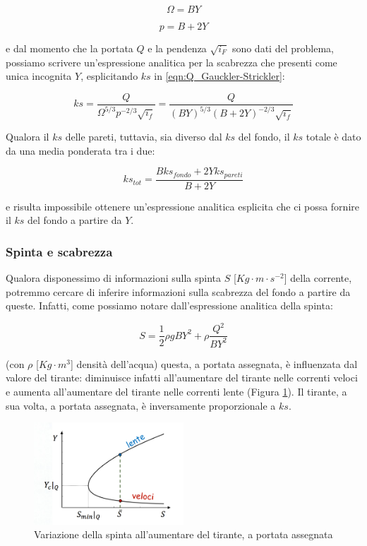 \documentclass[12pt]{article} %
\begin{document}
\begin{equation}
    \Omega=BY
\end{equation}

\begin{equation}
    p=B+2Y
\end{equation}

\noindent e dal momento che la portata $Q$ e la pendenza $\sqrt{i_F}$ sono dati del problema, possiamo scrivere un'espressione analitica per la scabrezza che presenti come unica incognita $Y$, esplicitando $ks$ in \ref{eqn:Q_Gauckler-Strickler}:

\begin{equation}
    ks=\frac{Q}{\Omega^{5/3}p^{-2/3}\sqrt{i_f}}=\frac{Q}{(BY)^{5/3}(B+2Y)^{-2/3}\sqrt{i_f}}
\end{equation}

\noindent Qualora il $ks$ delle pareti, tuttavia, sia diverso dal $ks$ del fondo, il $ks$ totale è dato da una media ponderata tra i due:

\begin{equation}
    ks_{tot} = \frac{Bks_{fondo} + 2Yks_{pareti}}{B+2Y}
\end{equation}

\noindent e risulta impossibile ottenere un'espressione analitica esplicita che ci possa fornire il $ks$ del fondo a partire da $Y$.

\subsubsection{Spinta e scabrezza}
\noindent Qualora disponessimo di informazioni sulla spinta $S$ [$Kg\cdot m\cdot s^{-2}$] della corrente, potremmo cercare di inferire informazioni sulla scabrezza del fondo a partire da queste. Infatti, come possiamo notare dall'espressione analitica della spinta:

\begin{equation}
    S=\frac{1}{2}\rho gBY^2+\rho\frac{Q^2}{BY^2}
    \label{eqn:S}
\end{equation}

\noindent (\noindent con $\rho$ [$Kg\cdot m^3$] densità dell'acqua) questa, a portata assegnata, è influenzata dal valore del tirante: diminuisce infatti all'aumentare del tirante nelle correnti veloci e aumenta all'aumentare del tirante nelle correnti lente (Figura \ref{fig:spinta}). Il tirante, a sua volta, a portata assegnata, è inversamente proporzionale a $ks$.

\begin{figure}
    \centering
    \includegraphics[width=0.5\textwidth]{Spinta.png}
    \caption{Variazione della spinta all'aumentare del tirante, a portata assegnata}
    \label{fig:spinta}
\end{figure}
\end{document}
